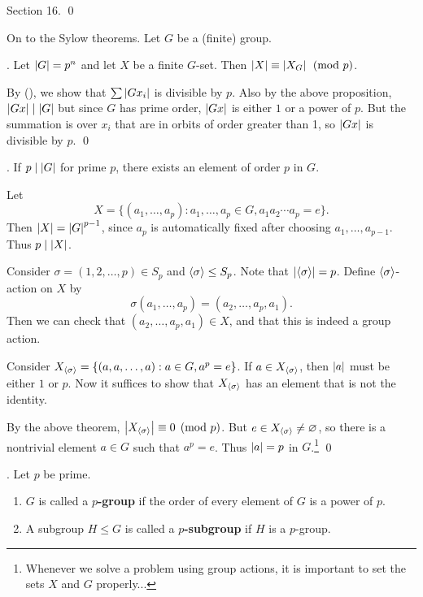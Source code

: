 \pf Section 16. \qed

\bigskip

On to the Sylow theorems. Let \(G\) be a (finite) group.

\thm. Let \(\left| G \right| = p^n\) and let \(X\) be a finite \(G\)-set. Then \(\left| X \right| \equiv \left| X_G \right| \pmod p\).

\pf By (\mast), we show that \(\sum \left| G x_i \right|\) is divisible by \(p\). Also by the above proposition, \(\left| Gx \right| \mid \left| G \right|\) but since \(G\) has prime order, \(\left| Gx \right|\) is either \(1\) or a power of \(p\). But the summation is over \(x_i\) that are in orbits of order greater than 1, so \(\left| Gx \right|\) is divisible by \(p\). \qed

\pagebreak

\thm.  If \(p \mid \left| G \right|\) for prime \(p\), there exists an element of order \(p\) in \(G\).

\pf Let
\[
    X = \{(a_1, \dots, a_p) : a_1, \dots, a_p \in G, a_1a_2\cdots a_p = e\}.
\]
Then \(\left| X \right| = \left| G \right|^{p-1}\), since \(a_p\) is automatically fixed after choosing \(a_1, \dots, a_{p-1}\). Thus \(p \mid \left| X \right|\).

Consider \(\sigma = (1, 2, \dots, p) \in S_p\) and \(\left\langle \sigma \right\rangle \leq S_p\). Note that \(\left| \left\langle \sigma \right\rangle \right| = p\). Define \(\left\langle \sigma \right\rangle\)-action on \(X\) by
\[
    \sigma(a_1, \dots, a_p) = (a_2, \dots, a_p, a_1).
\]
Then we can check that \((a_2, \dots, a_p, a_1) \in X\), and that this is indeed a group action.

Consider \(X_{\left\langle \sigma \right\rangle} = \{(a, a, \dots, a) : a \in G, a^p = e\}\). If \(a \in X_{\left\langle \sigma \right\rangle}\), then \(\left| a \right|\) must be either \(1\) or \(p\). Now it suffices to show that \(X_{\left\langle \sigma \right\rangle}\) has an element that is not the identity.

By the above theorem, \(\left| X_{\left\langle \sigma \right\rangle} \right| \equiv 0 \pmod p\). But \(e \in X_{\left\langle \sigma \right\rangle} \neq \varnothing\), so there is a nontrivial element \(a \in G\) such that \(a^p = e\). Thus \(\left| a \right| = p\) in \(G\).\footnote{Whenever we solve a problem using group actions, it is important to set the sets \(X\) and \(G\) properly...} \qed

.  Let \(p\) be prime.
\begin{enumerate}
    \item \(G\) is called a \textbf{\(p\)-group} if the order of every element of \(G\) is a power of \(p\).
    \item A subgroup \(H \leq G\) is called a \textbf{\(p\)-subgroup} if \(H\) is a \(p\)-group.
\end{enumerate}

